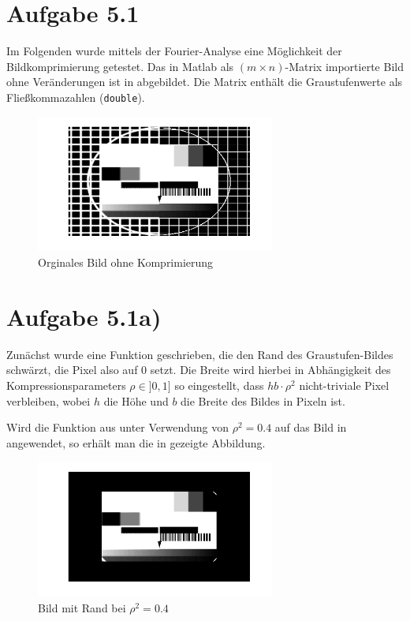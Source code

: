 \section*{Aufgabe 5.1}
Im Folgenden wurde mittels der Fourier-Analyse eine Möglichkeit der Bildkomprimierung
getestet. Das in Matlab als $(m\times n)$-Matrix importierte Bild ohne Veränderungen ist
in  abgebildet. Die Matrix enthält die Graustufenwerte als Fließkommazahlen
(\texttt{double}).

\begin{figure}[htb]
\centering
  \includegraphics[width=0.7\textwidth,keepaspectratio]{../tmp/original}
  \caption{Orginales Bild ohne Komprimierung}
  \label{fig:orig}
\end{figure}

\section*{Aufgabe 5.1a)}

Zunächst wurde eine Funktion  geschrieben, die den Rand des Graustufen-Bildes
schwärzt, die Pixel also auf 0 setzt. Die Breite wird hierbei in Abhängigkeit
des Kompressionsparameters $ρ \in ]0,1]$ so eingestellt, dass $hb\cdot ρ^2$
nicht-triviale Pixel verbleiben, wobei $h$ die Höhe und $b$ die Breite des
Bildes in Pixeln ist.

Wird die Funktion aus  unter Verwendung von $ρ^2 = 0.4$ auf das
Bild in  angewendet, so erhält man die in  gezeigte Abbildung.



\begin{figure}[htb]
\centering
  \includegraphics[width=0.7\textwidth,keepaspectratio]{../tmp/eins_a}
  \caption{Bild mit Rand bei $ρ^2 = 0.4$}
  \label{fig:1a}
\end{figure}

